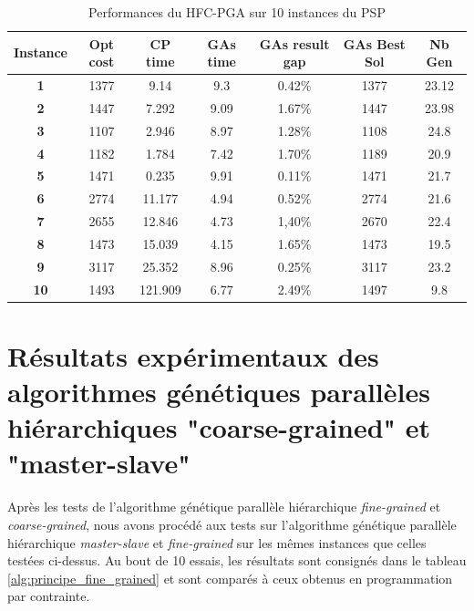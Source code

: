 \documentclass[12pt,a4paper]{article}
\begin{document}
	\begin{table}[h]
		\centering
		\begin{tabular}{|c|c|c|c|c|c|c|}
			\hline
			\textbf{Instance} & \textbf{Opt cost} & \textbf{CP time} & \textbf{GAs time} & \textbf{GAs result gap} & \textbf{GAs Best Sol} & \textbf{Nb Gen}\\
			\hline
			\textbf{1} & 1377 & 9.14 & 9.3 & 0.42\% & 1377 & 23.12 \\
			\textbf{2} & 1447 & 7.292 & 9.09 & 1.67\% & 1447 & 23.98\\
			\textbf{3} & 1107 & 2.946 & 8.97 & 1.28\% & 1108 & 24.8\\
			\textbf{4} & 1182 & 1.784 & 7.42 & 1.70\% & 1189 & 20.9\\
			\textbf{5} & 1471 & 0.235 & 9.91 & 0.11\% & 1471 & 21.7\\
			\textbf{6} & 2774 & 11.177 & 4.94 & 0.52\% & 2774 & 21.6\\
			\textbf{7} & 2655 & 12.846 & 4.73 & 1,40\% & 2670 & 22.4\\
			\textbf{8} & 1473 & 15.039 & 4.15 & 1.65\% & 1473 & 19.5\\
			\textbf{9} & 3117 & 25.352 & 8.96 & 0.25\% & 3117 & 23.2\\
			\textbf{10} & 1493 & 121.909 & 6.77 & 2.49\% & 1497 & 9.8\\
			\hline
		\end{tabular}	
		\caption{Performances du HFC-PGA sur 10 instances du PSP}	
	\end{table}			
		
		\section{Résultats expérimentaux des algorithmes génétiques parallèles hiérarchiques "coarse-grained" et "master-slave"}
		
		Après les tests de l'algorithme génétique parallèle hiérarchique \emph{fine-grained} et \emph{coarse-grained}, nous avons procédé aux tests sur l'algorithme génétique parallèle hiérarchique \emph{master-slave} et \emph{fine-grained} sur les mêmes instances que celles testées ci-dessus. Au bout de 10 essais, les résultats sont consignés dans le tableau \ref{alg:principe_fine_grained} et sont comparés à ceux obtenus en programmation par contrainte.
		
\end{document}
